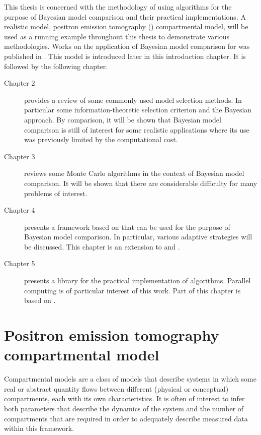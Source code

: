 This thesis is concerned with the methodology of using \smc algorithms for the
purpose of Bayesian model comparison and their practical implementations. A
realistic model, positron emission tomography (\pet) compartmental model, will
be used as a running example throughout this thesis to demonstrate various
methodologies. Works on the application of Bayesian model comparison for \pet
was published in \cite{Zhou2013}. This model is introduced later in this
introduction chapter. It is followed by the following chapter.
\begin{description}
  \item[Chapter 2] provides a review of some commonly used model selection
    methods. In particular some information-theoretic selection criterion and
    the Bayesian approach. By comparison, it will be shown that Bayesian model
    comparison is still of interest for some realistic applications where its
    use was previously limited by the computational cost.
  \item[Chapter 3] reviews some Monte Carlo algorithms in the context of
    Bayesian model comparison. It will be shown that there are considerable
    difficulty for many problems of interest.
  \item[Chapter 4] presents a framework based on \smc that can be used for the
    purpose of Bayesian model comparison. In particular, various adaptive
    strategies will be discussed. This chapter is an extension to
    \cite{Zhou:2012uz} and \cite{Zhou:2013vx}.
  \item[Chapter 5] presents a \cpp library for the practical implementation of
    \smc algorithms. Parallel computing is of particular interest of this
    work. Part of this chapter is based on \cite{vsmcjss}.
\end{description}

\section{Positron emission tomography compartmental model}
\label{sec:Positron emission tomography compartmental model}

Compartmental models are a class of models that describe systems in which some
real or abstract quantity flows between different (physical or conceptual)
compartments, each with its own characteristics. It is often of interest to
infer both parameters that describe the dynamics of the system and the number
of compartments that are required in order to adequately describe measured
data within this framework.

